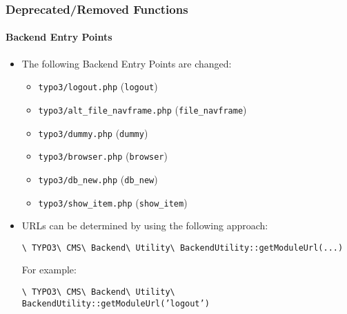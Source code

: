 \begin{frame}[fragile]
	\frametitle{Deprecated/Removed Functions}
	\framesubtitle{Backend Entry Points}

	\begin{itemize}

		\item The following Backend Entry Points are changed:

			\begin{itemize}
				\item \texttt{typo3/logout.php}					\tabto{6cm}(\begingroup\color{typo3orange}\texttt{logout}\endgroup)
				\item \texttt{typo3/alt\_file\_navframe.php}	\tabto{6cm}(\begingroup\color{typo3orange}\texttt{file\_navframe}\endgroup)
				\item \texttt{typo3/dummy.php}					\tabto{6cm}(\begingroup\color{typo3orange}\texttt{dummy}\endgroup)
				\item \texttt{typo3/browser.php}				\tabto{6cm}(\begingroup\color{typo3orange}\texttt{browser}\endgroup)
				\item \texttt{typo3/db\_new.php}				\tabto{6cm}(\begingroup\color{typo3orange}\texttt{db\_new}\endgroup)
				\item \texttt{typo3/show\_item.php}				\tabto{6cm}(\begingroup\color{typo3orange}\texttt{show\_item}\endgroup)
			\end{itemize}

		\item URLs can be determined by using the following approach:

			\smaller
				\texttt{\textbackslash
					TYPO3\textbackslash
					CMS\textbackslash
					Backend\textbackslash
					Utility\textbackslash
					BackendUtility::getModuleUrl(...)}
			\normalsize

			For example:

			\smaller
				\texttt{\textbackslash
					TYPO3\textbackslash
					CMS\textbackslash
					Backend\textbackslash
					Utility\textbackslash
					BackendUtility::getModuleUrl('}\begingroup\color{typo3orange}\texttt{logout}\endgroup\texttt{')}
			\normalsize

	\end{itemize}

\end{frame}


